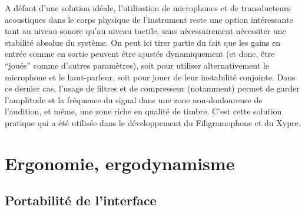 \indent A défaut d'une solution idéale, l'utilisation de microphones et de transducteurs acoustiques dans le corps physique de l'instrument reste une option intéressante tant au niveau sonore qu'au niveau tactile, sans nécessairement nécessiter une stabilité absolue du système. On peut ici tirer partie du fait que les gains en entrée comme en sortie peuvent être ajustés dynamiquement (et donc, être ``joués'' comme d'autres paramètres), soit pour utiliser alternativement le microphone et le haut-parleur, soit pour jouer de leur instabilité conjointe. Dans ce dernier cas, l'usage de filtres et de compresseur (notamment) permet de garder l'amplitude et la fréquence du signal dans une zone non-douloureuse de l'audition, et même, une zone riche en qualité de timbre. C'est cette solution pratique qui a été utilisée dans le développement du Filigramophone et du Xypre.


\section{Ergonomie, ergodynamisme}

\subsection{Portabilité de l'interface}

